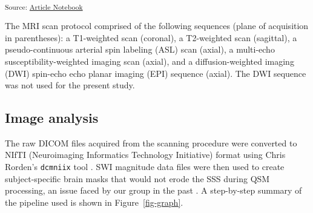 \documentclass[
true
]{sn-jnl}
\begin{document}
\textsubscript{Source:
\href{https://WeberLab.github.io/Chisep_CSVO2_Manuscript/index.qmd.html}{Article
Notebook}}

The MRI scan protocol comprised of the following sequences (plane of
acquisition in parentheses): a T1-weighted scan (coronal), a T2-weighted
scan (sagittal), a pseudo-continuous arterial spin labeling (ASL) scan
\citep{alsopRecommendedImplementationArterial2015} (axial), a multi-echo
susceptibility-weighted imaging scan
\citep{denkSusceptibilityWeightedImaging2010} (axial), and a
diffusion-weighted imaging (DWI) spin-echo echo planar imaging (EPI)
sequence (axial). The DWI sequence was not used for the present study.

\subsection{Image analysis}\label{image-analysis}

The raw DICOM files acquired from the scanning procedure were converted
to NIfTI (Neuroimaging Informatics Technology Initiative) format using
Chris Rorden's \texttt{dcmniix} tool
\citep{liFirstStepNeuroimaging2016}. SWI magnitude data files were then
used to create subject-specific brain masks that would not erode the SSS
during QSM processing, an issue faced by our group in the past
\citep{weberQuantitativeSusceptibilityMapping2021}. A step-by-step
summary of the pipeline used is shown in Figure~\ref{fig-graph}.
\end{document}
